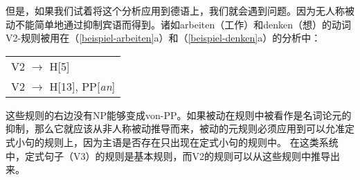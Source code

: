 但是，如果我们试着将这个分析应用到德语上，我们就会遇到问题。因为无人称被动不能简单地通过抑制宾语而得到。诸如arbeiten（工作）和denken（想）的动词V2-规则被用在（\ref{beispiel-arbeiten}a）和（\ref{beispiel-denken}a）的分析中：
\ea
\begin{tabular}[t]{@{}l@{}}
V2 $\to$ H[5]\\
V2 $\to$ H[13], PP[\emph{an}]\\
\end{tabular}
\z
这些规则的右边没有NP能够变成von-PP。如果被动在规则中被看作是名词论元的抑制，那么它就应该从非人称被动推导而来，被动的元规则必须应用到可以允准定式小句的规则上，因为主语是否存在只出现在定式小句的规则中。 在这类系统中，定式句子（V3）的规则是基本规则，而V2的规则可以从这些规则中推导出来。

